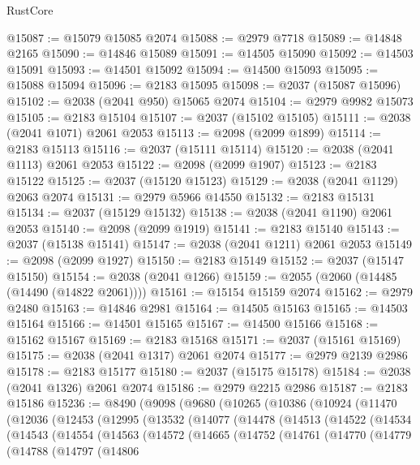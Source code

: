 \begin{lexlean}{RustCore}
\begin{coremodule}
@15087 := @15079 @15085 @2074
@15088 := @2979 @7718
@15089 := @14848 @2165
@15090 := @14846 @15089
@15091 := @14505 @15090
@15092 := @14503 @15091
@15093 := @14501 @15092
@15094 := @14500 @15093
@15095 := @15088 @15094
@15096 := @2183 @15095
@15098 := @2037 (@15087 @15096)
@15102 := @2038 (@2041 @950) @15065 @2074
@15104 := @2979 @9982 @15073
@15105 := @2183 @15104
@15107 := @2037 (@15102 @15105)
@15111 := @2038 (@2041 @1071) @2061 @2053
@15113 := @2098 (@2099 @1899)
@15114 := @2183 @15113
@15116 := @2037 (@15111 @15114)
@15120 := @2038 (@2041 @1113) @2061 @2053
@15122 := @2098 (@2099 @1907)
@15123 := @2183 @15122
@15125 := @2037 (@15120 @15123)
@15129 := @2038 (@2041 @1129) @2063 @2074
@15131 := @2979 @5966 @14550
@15132 := @2183 @15131
@15134 := @2037 (@15129 @15132)
@15138 := @2038 (@2041 @1190) @2061 @2053
@15140 := @2098 (@2099 @1919)
@15141 := @2183 @15140
@15143 := @2037 (@15138 @15141)
@15147 := @2038 (@2041 @1211) @2061 @2053
@15149 := @2098 (@2099 @1927)
@15150 := @2183 @15149
@15152 := @2037 (@15147 @15150)
@15154 := @2038 (@2041 @1266)
@15159 := @2055 (@2060 (@14485 (@14490 (@14822 @2061))))
@15161 := @15154 @15159 @2074
@15162 := @2979 @2480
@15163 := @14846 @2981
@15164 := @14505 @15163
@15165 := @14503 @15164
@15166 := @14501 @15165
@15167 := @14500 @15166
@15168 := @15162 @15167
@15169 := @2183 @15168
@15171 := @2037 (@15161 @15169)
@15175 := @2038 (@2041 @1317) @2061 @2074
@15177 := @2979 @2139 @2986
@15178 := @2183 @15177
@15180 := @2037 (@15175 @15178)
@15184 := @2038 (@2041 @1326) @2061 @2074
@15186 := @2979 @2215 @2986
@15187 := @2183 @15186
@15236 := @8490
    (@9098
      (@9680
        (@10265
          (@10386
            (@10924
              (@11470
                (@12036
                  (@12453
                    (@12995
                      (@13532
                        (@14077
                          (@14478
                            (@14513
                              (@14522
                                (@14534
                                  (@14543
                                    (@14554
                                      (@14563
                                        (@14572
                                          (@14665
                                            (@14752
                                              (@14761
                                                (@14770
                                                  (@14779
                                                    (@14788
                                                      (@14797
                                                        (@14806

\end{coremodule}
\end{lexlean}
